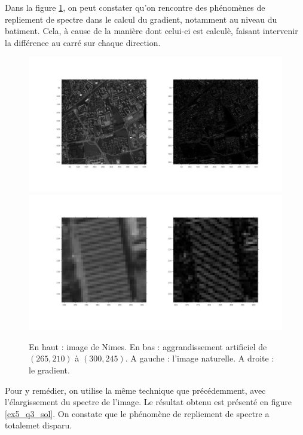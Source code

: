 \documentclass[12pt,a4paper,onecolumn]{article}
\begin{document}
Dans la figure \ref{ex5_q3}, on peut constater qu'on rencontre des phénomènes de repliement de spectre dans le calcul du gradient, notamment au niveau du batiment. Cela, à cause de la manière dont celui-ci est calculè, faisant intervenir la différence au carré sur chaque direction.
\begin{figure}[H]
	\begin{center}
		\includegraphics[width = \textwidth]{ex5_q3.jpg}
		\includegraphics[width = \textwidth]{ex5_q3_building.jpg}
	\end{center}
	\caption{En haut : image de Nimes. En bas : aggrandissement artificiel de $(265, 210)$ à $(300, 245)$. A gauche : l'image naturelle. A droite : le gradient.}
	\label{ex5_q3}
\end{figure}

Pour y remédier, on utilise la même technique que précédemment, avec l'élargissement du spectre de l'image. Le résultat obtenu est présenté en figure
\ref{ex5_q3_sol}. On constate que le phénomène de repliement de spectre a totalemet disparu.
\end{document}
